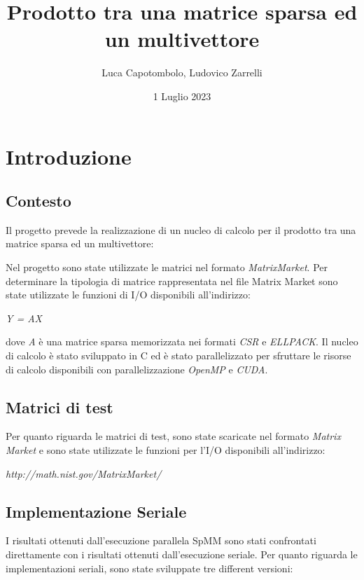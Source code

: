 \documentclass{article}
\title{Prodotto tra una matrice sparsa ed un multivettore}
\author{Luca Capotombolo, Ludovico Zarrelli}
\date{1 Luglio 2023}
\begin{document}
\maketitle

\tableofcontents

\clearpage

\section{Introduzione}

\subsection{Contesto}
Il progetto prevede la realizzazione di un nucleo di calcolo per il prodotto tra una matrice sparsa ed un multivettore:

Nel progetto sono state utilizzate le matrici nel formato \textit{MatrixMarket}. Per determinare la tipologia di matrice rappresentata nel file Matrix Market sono state utilizzate le funzioni di I/O disponibili all'indirizzo:
\begin{center}
\textit{Y = AX}
\end{center}
dove \textit{A} è una matrice sparsa memorizzata nei formati \textit{CSR} e \textit{ELLPACK}. Il nucleo di calcolo è stato sviluppato in C ed è stato parallelizzato per sfruttare le risorse di calcolo disponibili con parallelizzazione \textit{OpenMP} e \textit{CUDA}.

\subsection{Matrici di test}
Per quanto riguarda le matrici di test, sono state scaricate nel formato \textit{Matrix Market} e sono state utilizzate le funzioni per l'I/O disponibili all'indirizzo:

\begin{center}
\textit{http://math.nist.gov/MatrixMarket/}
\end{center}

\subsection{Implementazione Seriale}
I risultati ottenuti dall'esecuzione parallela SpMM sono stati confrontati direttamente con i risultati ottenuti dall'esecuzione seriale. Per quanto riguarda le implementazioni seriali, sono state sviluppate tre different versioni:
\end{document}
